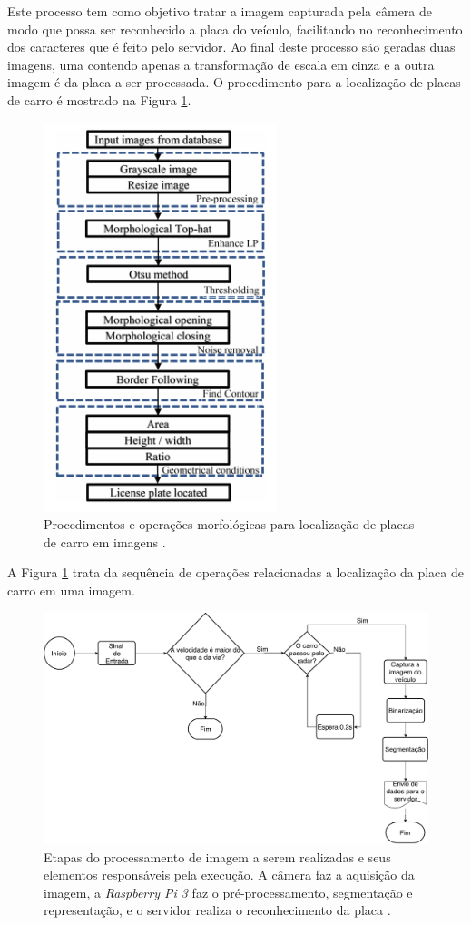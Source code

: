 Este processo tem como objetivo tratar a imagem capturada pela câmera de modo que possa ser reconhecido a placa do veículo, facilitando no reconhecimento dos caracteres que é feito pelo servidor. Ao final deste processo são geradas duas imagens, uma contendo apenas a transformação de escala em cinza e a outra imagem é da placa a ser processada. O procedimento para a localização de placas de carro é mostrado na Figura \ref{fig:proc_img}.
\begin{figure}[H]
    \centering
    \includegraphics[scale = 0.6]{figuras/procimagpng.png}    \caption{Procedimentos e operações morfológicas para localização de placas de carro em imagens \cite{yepez2018improved}.}
    \label{fig:proc_img}
\end{figure}
A Figura \ref{fig:proc_img} trata da sequência de operações relacionadas a localização da placa de carro em uma imagem. 

\begin{figure}[H]
    \centering
    \includegraphics[scale=0.4]{figuras/Diagrama_logico_imagem.pdf}
    \caption{Etapas do processamento de imagem a serem realizadas e seus elementos responsáveis pela execução. A câmera faz a aquisição da imagem, a \emph{Raspberry Pi 3} faz o pré-processamento, segmentação e representação, e o servidor realiza o reconhecimento da placa \cite{yepez2018improved}.} 
    \label{processamento_imagem}
\end{figure}

